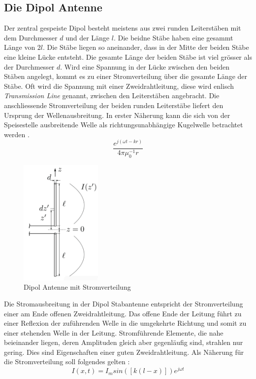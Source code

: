 \subsection{Die Dipol Antenne}\label{sec:DipolAntenne}
Der zentral gespeiste Dipol besteht meistens aus zwei runden Leiterstäben mit dem Durchmesser $d$ und der Länge $l$. Die beidne Stäbe haben eine gesammt Länge von $2l$. Die  Stäbe liegen so aneinander, dass in der Mitte der beiden Stäbe eine kleine Lücke entsteht. Die gesamte Länge der beiden Stäbe ist viel grösser als  der Durchmesser $d$. Wird eine Spannung  in der Lücke zwischen den beiden Stäben angelegt, kommt es zu einer Stromverteilung über die gesamte Länge der  Stäbe. Oft wird die Spannung mit einer Zweidrahtleitung,  diese wird enlisch \textit{Transmission Line} genannt, zwischen den Leiterstäben angebracht. Die anschliessende Stromverteilung der beiden runden Leiterstäbe liefert den Ursprung der Wellenausbreitung. In erster Näherung kann die sich von der Speisestelle ausbreitende Welle als richtungsunabhängige Kugelwelle betrachtet werden \cite{elliott1981antenna}.
\begin{equation}
\frac{e^{j(\omega t-kr)}}{4\pi \mu_{0}^{-1}r}
\end{equation}

\begin{figure}[!htb]
	\centering
	\includegraphics[width=4cm]{content/bilder/Dipol_EMANT_S42.pdf}%
	\caption{Dipol Antenne mit Stromverteilung \cite{Tekom}}
	\label{FitzDipol}
\end{figure}

Die Stromausbreitung in der Dipol Stabantenne entspricht der Stromverteilung einer am Ende offenen Zweidrahtleitung. Das offene Ende der Leitung führt zu einer Reflexion der zuführenden Welle in die umgekehrte Richtung und somit zu einer stehenden Welle in der Leitung. Stromführende Elemente, die nahe beieinander liegen, deren Amplituden gleich aber gegenläufig sind, strahlen nur gering. Dies sind Eigenschaften einer guten Zweidrahtleitung.
Als Näherung für die Stromverteilung soll folgendes gelten \cite{elliott1981antenna}:
\begin{equation}
I(x,t) =I_{m}sin([k(l-x)])e^{j\omega t}
\end{equation}

